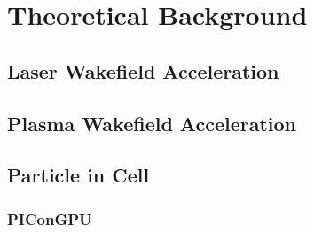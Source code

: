 \documentclass[bachelor_thesis]{subfiles}
\begin{document}
\chapter{Theoretical Background}
\section{Laser Wakefield Acceleration}
\section{Plasma Wakefield Acceleration}
\section{Particle in Cell}

\subsection{PIConGPU}
\end{document}
